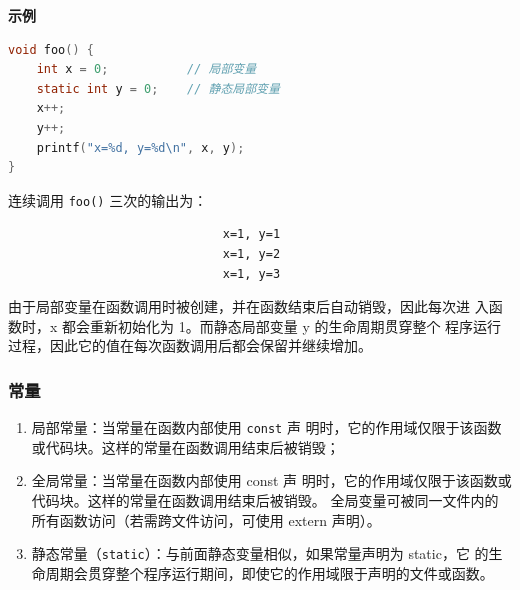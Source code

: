 \vspace{1em}%
\noindent%
\textbf{示例}
\begin{lstlisting}[language=C,caption={局部变量与静态局部变量示例},label={lst:foo_static}]
void foo() {
    int x = 0;           // 局部变量
    static int y = 0;    // 静态局部变量
    x++;
    y++;
    printf("x=%d, y=%d\n", x, y);
}
\end{lstlisting}

\vspace{1em}%
\vspace{1em}%
\vspace{1em}%

\noindent
连续调用 \texttt{foo()} 三次的输出为：

\begin{verbatim}
                              x=1, y=1
                              x=1, y=2
                              x=1, y=3
\end{verbatim}



由于局部变量在函数调用时被创建，并在函数结束后自动销毁，因此每次进
入函数时，x 都会重新初始化为 1。而静态局部变量 y 的生命周期贯穿整个
程序运行过程，因此它的值在每次函数调用后都会保留并继续增加。


\subsubsection{常量}

\begin{enumerate}[label={（\arabic*）}] %
  \item 局部常量：当常量在函数内部使用 \texttt{const} 声
  明时，它的作用域仅限于该函数或代码块。这样的常量在函数调用结束后被销毁；
  \item 全局常量：当常量在函数内部使用 const 声
  明时，它的作用域仅限于该函数或代码块。这样的常量在函数调用结束后被销毁。
    全局变量可被同一文件内的所有函数访问（若需跨文件访问，可使用 extern 声明）。
  \item 静态常量（\texttt{static}）：与前面静态变量相似，如果常量声明为 static，它
  的生命周期会贯穿整个程序运行期间，即使它的作用域限于声明的文件或函数。
\end{enumerate}






